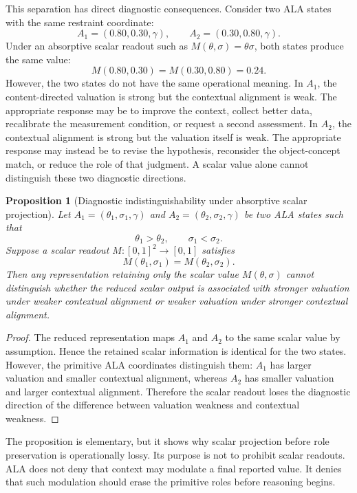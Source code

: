 \documentclass[reqno,final]{amsart}
\theoremstyle{definition}
\theoremstyle{plain}
\newtheorem{proposition}{Proposition}
\theoremstyle{remark}
\begin{document}
This separation has direct diagnostic consequences. Consider two ALA states with the same restraint coordinate:
\[
A_1=(0.80,0.30,\gamma),\qquad A_2=(0.30,0.80,\gamma).
\]
Under an absorptive scalar readout such as \(M(\theta,\sigma)=\theta\sigma\), both states produce the same value:
\[
M(0.80,0.30)=M(0.30,0.80)=0.24.
\]
However, the two states do not have the same operational meaning. In \(A_1\), the content-directed valuation is strong but the contextual alignment is weak. The appropriate response may be to improve the context, collect better data, recalibrate the measurement condition, or request a second assessment. In \(A_2\), the contextual alignment is strong but the valuation itself is weak. The appropriate response may instead be to revise the hypothesis, reconsider the object-concept match, or reduce the role of that judgment. A scalar value alone cannot distinguish these two diagnostic directions.

\begin{proposition}[Diagnostic indistinguishability under absorptive scalar projection]
Let \(A_1=(\theta_1,\sigma_1,\gamma)\) and \(A_2=(\theta_2,\sigma_2,\gamma)\) be two ALA states such that
\[
\theta_1>\theta_2,\qquad \sigma_1<\sigma_2.
\]
Suppose a scalar readout \(M:[0,1]^2\to[0,1]\) satisfies
\[
M(\theta_1,\sigma_1)=M(\theta_2,\sigma_2).
\]
Then any representation retaining only the scalar value \(M(\theta,\sigma)\) cannot distinguish whether the reduced scalar output is associated with stronger valuation under weaker contextual alignment or weaker valuation under stronger contextual alignment.
\end{proposition}

\begin{proof}
The reduced representation maps \(A_1\) and \(A_2\) to the same scalar value by assumption. Hence the retained scalar information is identical for the two states. However, the primitive ALA coordinates distinguish them: \(A_1\) has larger valuation and smaller contextual alignment, whereas \(A_2\) has smaller valuation and larger contextual alignment. Therefore the scalar readout loses the diagnostic direction of the difference between valuation weakness and contextual weakness.
\end{proof}

The proposition is elementary, but it shows why scalar projection before role preservation is operationally lossy. Its purpose is not to prohibit scalar readouts. ALA does not deny that context may modulate a final reported value. It denies that such modulation should erase the primitive roles before reasoning begins.
\end{document}
